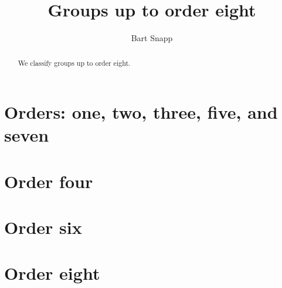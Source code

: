 \documentclass{ximera}
\author{Bart Snapp}
\title{Groups up to order eight}
\begin{document}
\begin{abstract}
  We classify groups up to order eight.
\end{abstract}
\maketitle

\section{Orders: one, two, three, five, and seven}

\section{Order four}

\section{Order six}

\section{Order eight}
\end{document}
